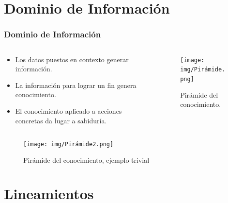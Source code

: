 \section{Dominio de Información}

\insertsectionpage

\begin{frame}[allowframebreaks]

  \frametitle{Dominio de Información}

  \begin{columns}
    \begin{column}{.5\textwidth}
      \begin{itemize}
        \item Los datos puestos en contexto generar información.
        \item La información para lograr un fin genera conocimiento.
        \item El conocimiento aplicado a acciones concretas da lugar a sabiduría.
      \end{itemize}
    \end{column}

    \begin{column}{.5\textwidth}
      \begin{figure}[ht]
        \centering
        \texttt{[image: img/Pirámide.png]}
        \caption{\label{fig:dominio-piramide} Pirámide del conocimiento.\cite{MinTIC2021}}
      \end{figure}
    \end{column}
  \end{columns}
  
  \begin{figure}[ht]
    \centering
    \texttt{[image: img/Pirámide2.png]}
    \caption{\label{fig:dominio-piramide-2} Pirámide del conocimiento, ejemplo trivial\cite{MinTIC2021}}
  \end{figure}

\end{frame}

\section{Lineamientos}

\insertsectionpage

